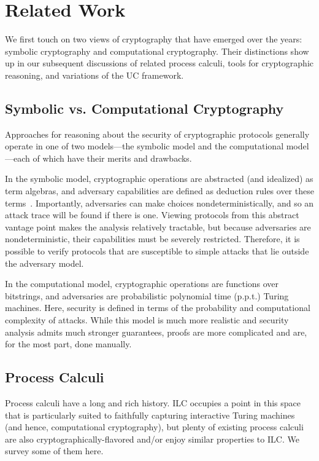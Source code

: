 \section{Related Work}
\label{sec:related}

We first touch on two views of cryptography that have emerged over the
years: symbolic cryptography and computational cryptography. Their distinctions
show up in our subsequent discussions of related process calculi, tools for
cryptographic reasoning, and variations of the UC framework.

\subsection{Symbolic vs. Computational Cryptography}
\label{subsec:symbolic-computational}

Approaches for reasoning about the security of cryptographic protocols generally
operate in one of two models---the symbolic model and the computational model---each
of which have their merits and drawbacks.

In the symbolic model, cryptographic operations are abstracted (and idealized)
as term algebras, and adversary capabilities are defined as deduction rules over
these terms~\cite{cortier2011survey}. Importantly, adversaries can make choices
nondeterministically, and so an attack trace will be found if there is
one. Viewing protocols from this abstract vantage point makes the analysis
relatively tractable, but because adversaries are nondeterministic, their
capabilities must be severely restricted. Therefore, it is possible to verify
protocols that are susceptible to simple attacks that lie outside the adversary
model.

In the computational model, cryptographic operations are functions over
bitstrings, and adversaries are probabilistic polynomial time (p.p.t.) Turing
machines. Here, security is defined in terms of the probability and
computational complexity of attacks. While this model is much more realistic and
security analysis admits much stronger guarantees, proofs are more complicated
and are, for the most part, done manually.

\subsection{Process Calculi}
\label{subsec:process-calculi}

Process calculi have a long and rich history. ILC occupies a point in this space
that is particularly suited to faithfully capturing interactive Turing machines
(and hence, computational cryptography), but plenty of existing process calculi
are also cryptographically-flavored and/or enjoy similar properties to ILC. We
survey some of them here.

